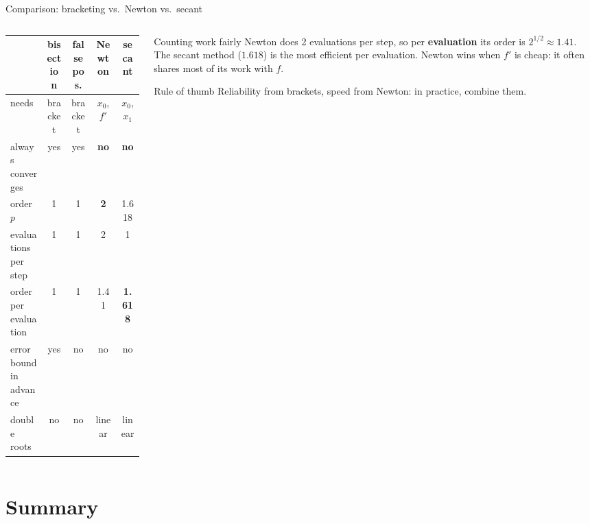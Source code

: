 \documentclass[aspectratio=169]{beamer}
\begin{document}
\begin{frame}{Comparison: bracketing vs.\ Newton vs.\ secant}
\begin{columns}[c]
\begin{column}{0.58\textwidth}
\centering
\scriptsize
\setlength{\tabcolsep}{2.5pt}
\begin{tabular}{lcccc}
\toprule
 & bisection & false pos. & Newton & secant \\
\midrule
needs & bracket & bracket & $x_0$, $f'$ & $x_0$, $x_1$ \\
always converges & yes & yes & \textbf{no} & \textbf{no} \\
order $p$ & 1 & 1 & \textbf{2} & 1.618 \\
evaluations per step & 1 & 1 & 2 & 1 \\
order per evaluation & 1 & 1 & 1.41 & \textbf{1.618} \\
error bound in advance & yes & no & no & no \\
double roots & no & no & linear & linear \\
\bottomrule
\end{tabular}
\end{column}
\begin{column}{0.39\textwidth}
\begin{block}{Counting work fairly}
\footnotesize Newton does 2 evaluations per step, so per \textbf{evaluation} its order is $2^{1/2} \approx 1.41$. The secant method ($1.618$) is the most efficient per evaluation. Newton wins when $f'$ is cheap: it often shares most of its work with $f$.
\end{block}
\begin{alertblock}{Rule of thumb}
\footnotesize Reliability from brackets, speed from Newton: in practice, combine them.
\end{alertblock}
\end{column}
\end{columns}
\end{frame}

\section{Summary}
\end{document}
